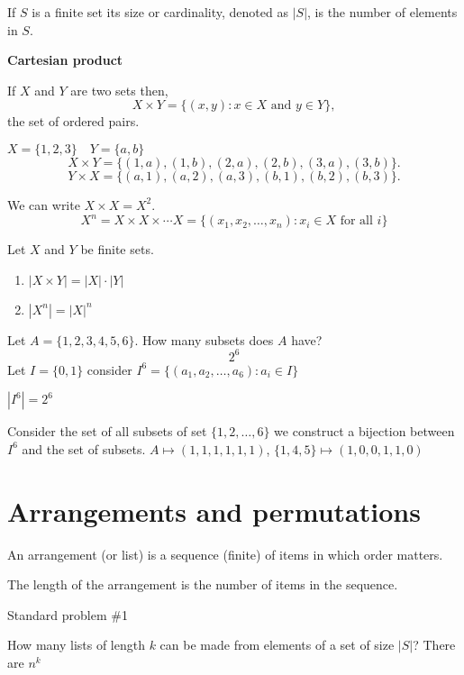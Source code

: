 \documentclass[10pt, a4paper]{article}
\begin{document}
If $S$ is a finite set its size or cardinality, denoted as $|S|$, is the number of elements in $S$.

\textbf{Cartesian product}

If $X$ and $Y$ are two sets then, 
\[
X \times Y = \{(x, y) : x \in X \text{ and } y \in Y\},
\]
the set of ordered pairs.

\begin{example}
    $X = \{1, 2, 3\}\quad Y = \{a, b\}$
    \[
    X \times Y = \{(1, a), (1, b), (2, a), (2, b), (3, a), (3, b)\}.
    \]
    \[
    Y \times X = \{(a, 1), (a, 2), (a, 3), (b, 1), (b, 2), (b, 3)\}.
    \]
\end{example}
We can write $X \times X = X ^ 2$.
\[
X ^ n = X \times X \times \dotsi X = \{(x_1, x_2, \dots, x_n) : x_i \in X \text{ for all } i\}
\]

\begin{proposition}
    Let $X$ and $Y$ be finite sets.
    \begin{enumerate}[label = (\alph*)]
        \item $|X \times Y| = |X|\cdot|Y|$
        \item $|X ^ n| = |X| ^ n$
    \end{enumerate}
\end{proposition}

\begin{example}
    Let $A = \{1, 2, 3, 4, 5, 6\}$. How many subsets does $A$ have?
    \[
    2 ^ 6
    \]
    Let $I = \{0, 1\}$ consider $I ^ 6 = \{(a_1, a_2, \dots, a_6) : a_i \in I\}$

    $|I ^ 6| = 2 ^ 6$
    
    Consider the set of all subsets of set $\{1, 2, \dots, 6\}$ we construct a bijection between $I ^ 6$ and the set of subsets. $A \mapsto (1, 1, 1, 1, 1, 1)$, $\{1, 4, 5\} \mapsto (1, 0, 0, 1, 1, 0)$
\end{example}

\section{Arrangements and permutations}
An arrangement (or list) is a sequence (finite) of items in which order matters.

The length of the arrangement is the number of items in the sequence.

Standard problem \#1

How many lists of length $k$ can be made from elements of a set of size $|S|$? There are $n ^ k$
\end{document}
